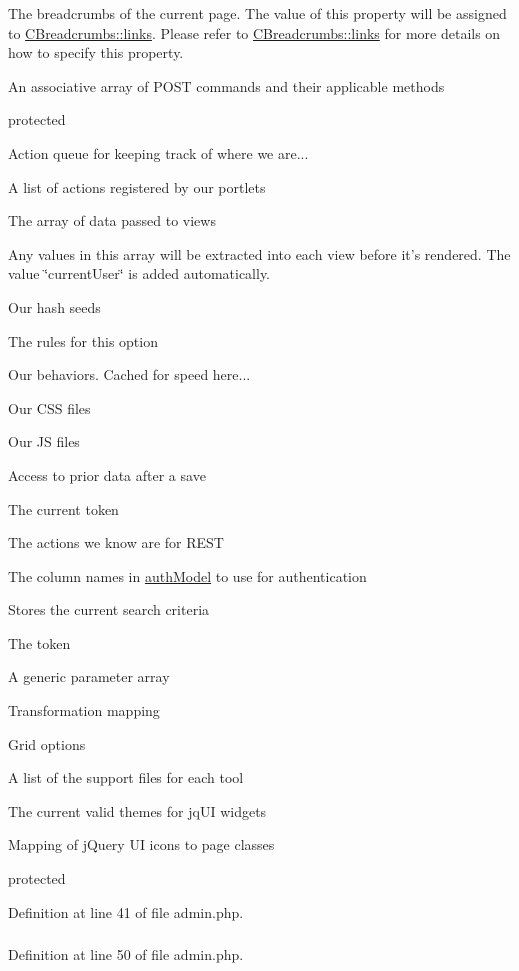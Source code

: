 The breadcrumbs of the current page. The value of this property will be assigned to \hyperlink{}{CBreadcrumbs::links}. Please refer to \hyperlink{}{CBreadcrumbs::links} for more details on how to specify this property.

An associative array of POST commands and their applicable methods

protected

Action queue for keeping track of where we are...

A list of actions registered by our portlets

The array of data passed to views

Any values in this array will be extracted into each view before it's rendered. The value \char`\"{}currentUser\char`\"{} is added automatically.

Our hash seeds

The rules for this option

Our behaviors. Cached for speed here...

Our CSS files

Our JS files

Access to prior data after a save

The current token

The actions we know are for REST

The column names in \hyperlink{}{authModel} to use for authentication

Stores the current search criteria

The token

A generic parameter array

Transformation mapping

Grid options

A list of the support files for each tool

The current valid themes for jqUI widgets

Mapping of jQuery UI icons to page classes

protected 

Definition at line 41 of file admin.php.

\hypertarget{admin_8php_a2c8135527015cd4586959ac7c2ffec92}{
\subsubsection[{HTML}]{}}
\label{admin_8php_a2c8135527015cd4586959ac7c2ffec92}


Definition at line 50 of file admin.php.

